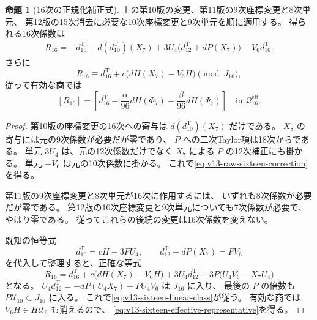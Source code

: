\documentclass[a4paper,11pt]{ltjsarticle}
\theoremstyle{definition}
\newtheorem{proposition}[theorem]{命題}
\begin{document}
\begin{proposition}[16次の正規化補正式]
\label{prop:v13-actual-sixteen-correction}
上の第10版の変更、第11版の9次座標変更と8次単元、
第12版の15次消去に必要な10次座標変更と9次単元を順に適用する。
得られる16次係数は
\begin{equation}\label{eq:v13-raw-sixteen-correction}
 \boxed{\begin{aligned}
 R_{16}={}&d^{\mathrm T}_{16}+d(d^{\mathrm T}_{10})(X_7)
        +3U_4\bigl(d^{\mathrm T}_{12}+dP(X_7)\bigr)
        -V_6d^{\mathrm T}_{10}.
 \end{aligned}}
\end{equation}
さらに
\begin{equation}\label{eq:v13-sixteen-linear-class}
 R_{16}\equiv d^{\mathrm T}_{16}
                  +c\bigl(dH(X_7)-V_6H\bigr)\pmod{J_{16}},
\end{equation}
従って有効な商では
\begin{equation}\label{eq:v13-sixteen-effective-representative}
 \boxed{\displaystyle
 [R_{16}]
 =\left[d^{\mathrm T}_{16}
       -\frac{\alpha}{96}dH(\Phi_7)
       -\frac{\beta}{96}dH(\Psi_7)\right]
 \quad\text{in }\mathcal Q^{\mathrm{eff}}_{16}.
 }
\end{equation}
\end{proposition}
\begin{proof}
第10版の座標変更の16次への寄与は
$d(d^{\mathrm T}_{10})(X_7)$ だけである。
$X_8$ の寄与には元の9次係数が必要だが零であり、
$P$ への二次Taylor項は18次からである。
単元 $3U_4$ は、元の12次係数だけでなく
$X_7$ による $P$ の12次補正にも掛かる。
単元 $-V_6$ は元の10次係数に掛かる。
これで\eqref{eq:v13-raw-sixteen-correction}を得る。

第11版の9次座標変更と8次単元が16次に作用するには、
いずれも8次係数が必要だが零である。
第12版の10次座標変更と9次単元についても7次係数が必要で、やはり零である。
従ってこれらの後続の変更は16次係数を変えない。

既知の恒等式
\[
 d^{\mathrm T}_{10}=cH-3PU_4,\qquad
 d^{\mathrm T}_{12}+dP(X_7)=PV_6
\]
を代入して整理すると、正確な等式
\[
 R_{16}=d^{\mathrm T}_{16}
       +c\bigl(dH(X_7)-V_6H\bigr)
       +3U_4d^{\mathrm T}_{12}
       +3P\bigl(U_4V_6-X_7U_4\bigr)
\]
となる。
$U_4d^{\mathrm T}_{12}=-dP(U_4X_7)+PU_4V_6$ は $J_{16}$ に入り、
最後の $P$ の倍数も $P\mathcal U_{10}\subset J_{16}$ に入る。
これで\eqref{eq:v13-sixteen-linear-class}が従う。
有効な商では $V_6H\in H\mathcal U_6$ も消えるので、
\eqref{eq:v13-sixteen-effective-representative}を得る。
\end{proof}
\end{document}
